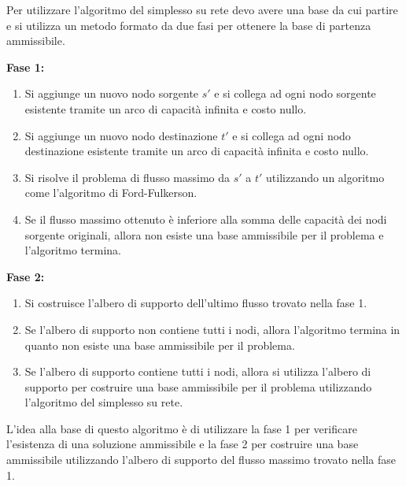 Per utilizzare l'algoritmo del simplesso su rete devo avere una base da cui partire
e si utilizza un metodo formato da due fasi per ottenere la base di partenza ammissibile.


\textbf{Fase 1:}
\begin{enumerate}
\item Si aggiunge un nuovo nodo sorgente $s'$ e si collega ad ogni nodo sorgente esistente tramite un arco di capacità infinita e costo nullo.
\item Si aggiunge un nuovo nodo destinazione $t'$ e si collega ad ogni nodo destinazione esistente tramite un arco di capacità infinita e costo nullo.
\item Si risolve il problema di flusso massimo da $s'$ a $t'$ utilizzando un algoritmo come l'algoritmo di Ford-Fulkerson.
\item Se il flusso massimo ottenuto è inferiore alla somma delle capacità dei nodi sorgente originali, allora non esiste una base ammissibile per il problema e l'algoritmo termina.
\end{enumerate}

\textbf{Fase 2:}
\begin{enumerate}
\item Si costruisce l'albero di supporto dell'ultimo flusso trovato nella fase 1.
\item Se l'albero di supporto non contiene tutti i nodi, allora l'algoritmo termina in quanto non esiste una base ammissibile per il problema.
\item Se l'albero di supporto contiene tutti i nodi, allora si utilizza l'albero di supporto per costruire una base ammissibile per il problema utilizzando l'algoritmo del simplesso su rete.
\end{enumerate}

L'idea alla base di questo algoritmo è di utilizzare la fase 1 per verificare l'esistenza di una soluzione ammissibile e la fase 2 per costruire una base ammissibile utilizzando l'albero di supporto del flusso massimo trovato nella fase 1.

